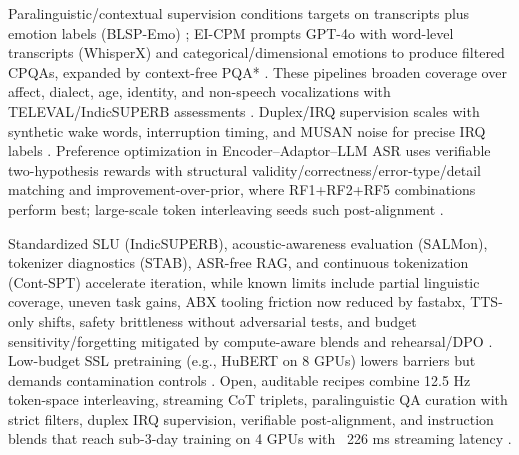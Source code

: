 \documentclass{article}
\begin{document}
Paralinguistic/contextual supervision conditions targets on transcripts plus emotion labels (BLSP-Emo) \cite{wang2024blspemotowardsempatheticlargespeechlangu}; EI-CPM prompts GPT-4o with word-level transcripts (WhisperX) and categorical/dimensional emotions to produce filtered CPQAs, expanded by context-free PQA* \cite{wang2025incorporatingcontextualparalinguisticund}. These pipelines broaden coverage over affect, dialect, age, identity, and non-speech vocalizations with TELEVAL/IndicSUPERB assessments \cite{chen2025goatslmspokenlanguagemodelparalinguistic,entry2025indicsuperbspeechprocessinguniversalperf,tian2025espnetspeechlmopenspeechlanguagemodeltoo}. Duplex/IRQ supervision scales with synthetic wake words, interruption timing, and MUSAN noise for precise IRQ labels \cite{ma2024languagemodelcanlistenwhilespeaking}. Preference optimization in Encoder--Adaptor--LLM ASR uses verifiable two-hypothesis rewards with structural validity/correctness/error-type/detail matching and improvement-over-prior, where RF1+RF2+RF5 combinations perform best; large-scale token interleaving seeds such post-alignment \cite{li2025seewossubmissionmlcslmlessonslearnedspee,zeng2024scalingspeechtextpretrainingsyntheticint}.

Standardized SLU (IndicSUPERB), acoustic-awareness evaluation (SALMon), tokenizer diagnostics (STAB), ASR-free RAG, and continuous tokenization (Cont-SPT) accelerate iteration, while known limits include partial linguistic coverage, uneven task gains, ABX tooling friction now reduced by fastabx, TTS-only shifts, safety brittleness without adversarial tests, and budget sensitivity/forgetting mitigated by compute-aware blends and rehearsal/DPO \cite{entry2025indicsuperbspeechprocessinguniversalperf,maimon2025salmonsuiteacousticlanguagemodelevaluati,vashishth2024stabspeechtokenizerassessmentbenchmark,min2025speechretrievalaugmentedgenerationwithou,li2025continuousspeechtokenizertext,poli2025fastabxlibraryefficientcomputationabxdis,wang2023slmbridgethingapbetweenspeechtextfoundat,maimon2025slammingtrainingspeechlanguagemodelonegp}. Low-budget SSL pretraining (e.g., HuBERT on 8 GPUs) lowers barriers but demands contamination controls \cite{chen2023reducingbarriersselfsupervisedlearninghu,tseng2025evaluationllmsspeechisoftenflawedtestset}. Open, auditable recipes combine 12.5 Hz token-space interleaving, streaming CoT triplets, paralinguistic QA curation with strict filters, duplex IRQ supervision, verifiable post-alignment, and instruction blends that reach sub-3-day training on 4 GPUs with ~226 ms streaming latency \cite{zeng2024scalingspeechtextpretrainingsyntheticint,guo2025streamuniachievingstreamingspeechtransla,wang2025incorporatingcontextualparalinguisticund,ma2024languagemodelcanlistenwhilespeaking,li2025seewossubmissionmlcslmlessonslearnedspee,peng2025voicetextblenderaugmentinglargelanguagem,fang2025llamaomniseamlessspeechinteractionlargel,maimon2025slammingtrainingspeechlanguagemodelonegp,lu2025desta2developinginstructionfollowingspee}.
\end{document}
